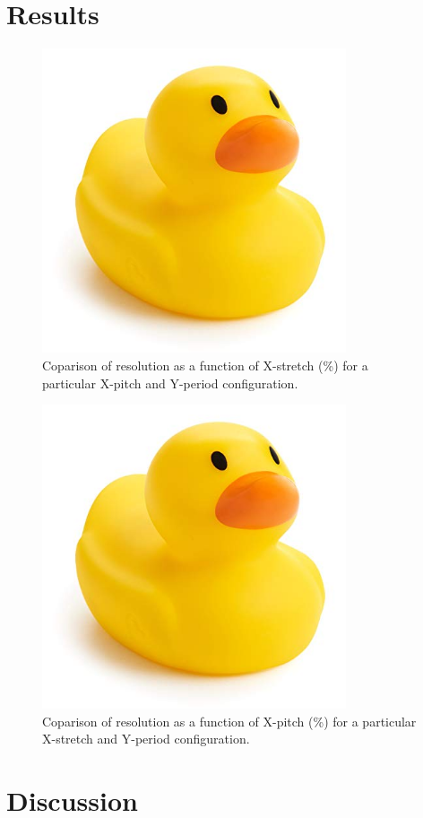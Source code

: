 \documentclass{article}
\begin{document}
\section{Results}
\begin{figure}
  \includegraphics[width=0.8\textwidth]{fig/temp.jpg}
  \caption{Coparison of resolution as a function of X-stretch (\%) for a particular X-pitch and Y-period configuration.}
\end{figure}
\begin{figure}
  \includegraphics[width=0.8\textwidth]{fig/temp.jpg}
  \caption{Coparison of resolution as a function of X-pitch (\%) for a particular X-stretch and Y-period configuration.}
\end{figure}

\section{Discussion}
\end{document}
